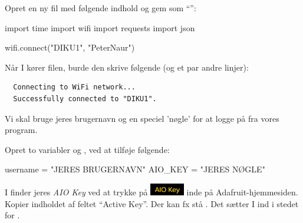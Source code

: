 \documentclass{ucph-handout}
\begin{document}
\begin{exercisebox}[adjusted title=Forbind til WiFi fra microcontroller]
\vspace{-2mm}
Opret en ny fil med følgende indhold og gem som ``'':
\begin{python}
import time
import wifi
import requests
import json

wifi.connect("DIKU1", "PeterNaur")
\end{python}

\noindent
Når I kører filen, burde den skrive følgende (og et par andre
linjer):
\begin{lstlisting}
  Connecting to WiFi network...
  Successfully connected to "DIKU1".
\end{lstlisting}
 Vi skal bruge jeres
brugernavn og en speciel 'nøgle' for at logge på
 fra vores program.

Opret to variabler  og , ved at tilføje følgende:
\begin{python}
  username = "JERES BRUGERNAVN"
  AIO_KEY = "JERES NØGLE"
\end{python}

I finder jeres \textit{AIO Key} ved at trykke på
\includegraphics[width=15mm]{illustrationer/adafruit_aiokey_button}
inde på Adafruit-hjemmesiden. Kopier indholdet af feltet "`Active
Key"'. Der kan fx stå . Det
sætter I ind i stedet for .
\end{exercisebox}
\end{document}
